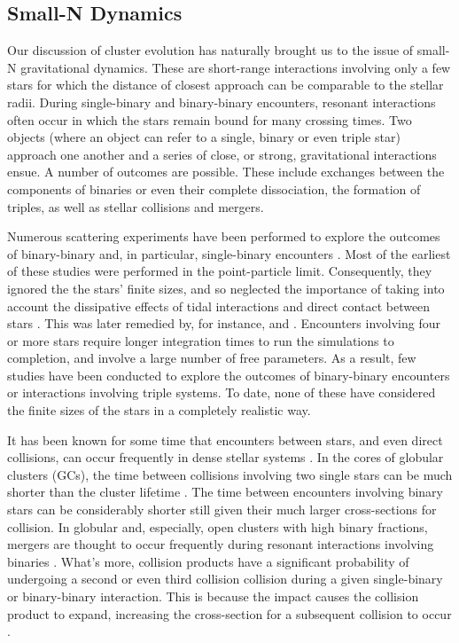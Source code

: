 \subsection{Small-N Dynamics} \label{small-N}

Our discussion of cluster evolution has naturally brought us to the
issue of small-N gravitational dynamics.  These are short-range
interactions involving only a few stars for which the distance of
closest approach can be 
comparable to the stellar radii.  During single-binary
and binary-binary encounters, resonant interactions often occur in
which the stars remain bound for many crossing times.  Two
objects (where an object can refer to a single, binary or even triple 
star) approach one another and a series of close, or strong,
gravitational interactions ensue.  
A number of outcomes are possible.  These include exchanges between
the components of binaries or even their complete dissociation, the
formation of triples, as well as stellar collisions and mergers.

Numerous scattering experiments have been performed to
explore the outcomes of binary-binary and, in particular,
single-binary encounters
\citep[e.g.][]{mcmillan86, sigurdsson93, fregeau04}.  Most of the
earliest of these studies were
performed in the point-particle limit.  Consequently, they ignored the
the stars' finite sizes, and so neglected the importance of
taking into account 
the dissipative effects of tidal interactions and direct contact
between stars \citep[e.g.][]{hut83a, mikkola83}.  This was later
remedied by, for instance, \citet{mcmillan87} and \citet{cleary90}.
Encounters involving four or more stars require longer integration times
to run the simulations to completion, and involve a large number of
free parameters.  As a result, few studies have been
conducted to explore the outcomes of binary-binary encounters or
interactions involving triple systems.  To date, none of these have
considered the finite sizes of the stars in a completely realistic way.

It has been known for some time that encounters between stars, and
even direct collisions, can occur frequently in dense stellar
systems \citep[e.g.]{hills76, hut83a, leonard89}.  In the cores of
globular clusters (GCs), the time between collisions
involving two single stars can 
be much shorter than the cluster lifetime \citep{leonard89}.  
The time between encounters involving binary stars can be
considerably shorter still given their much larger cross-sections for
collision.  In globular and, especially, open clusters with high
binary fractions, mergers are thought to occur frequently during
resonant interactions involving binaries \citep[e.g.][]{leonard92}.
What's more, collision products have a significant probability of
undergoing a second or even third collision 
collision during a given single-binary or binary-binary interaction.
This is because the impact causes the collision product to expand, 
increasing the cross-section for a
subsequent collision to occur \citep[e.g.][]{fregeau04}.

